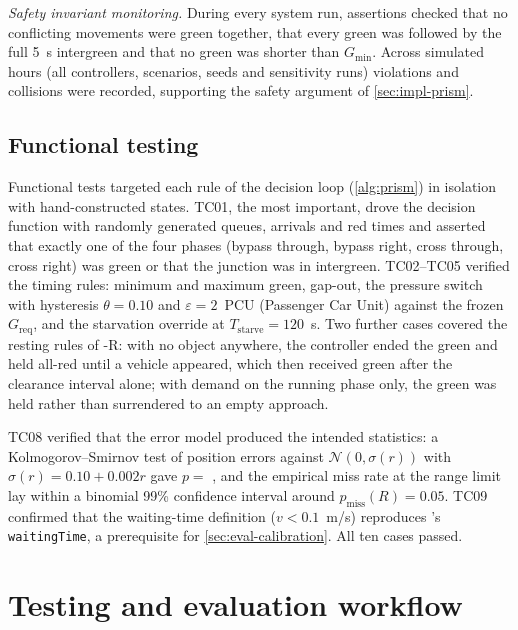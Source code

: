 \textit{Safety invariant monitoring.} During every system run, assertions checked that no conflicting movements were green together, that every green was followed by the full 5~s intergreen and that no green was shorter than $G_{\min}$. Across  simulated hours (all controllers, scenarios, seeds and sensitivity runs)  violations and  \sumo{} collisions were recorded, supporting the safety argument of \cref{sec:impl-prism}.

\subsection{Functional testing}\label{sec:eval-functional}

Functional tests targeted each rule of the decision loop (\cref{alg:prism}) in isolation with hand-constructed states. TC01, the most important, drove the decision function with randomly generated queues, arrivals and red times and asserted that exactly one of the four phases (bypass through, bypass right, cross through, cross right) was green or that the junction was in intergreen. TC02--TC05 verified the timing rules: minimum and maximum green, gap-out, the pressure switch with hysteresis $\theta = 0.10$ and $\varepsilon = 2$~PCU (Passenger Car Unit) against the frozen $G_{\text{req}}$, and the starvation override at $T_{\text{starve}} = 120$~s. Two further cases covered the resting rules of \prism{}-R: with no object anywhere, the controller ended the green and held all-red until a vehicle appeared, which then received green after the clearance interval alone; with demand on the running phase only, the green was held rather than surrendered to an empty approach.

TC08 verified that the \vls{} error model produced the intended statistics: a Kolmogorov--Smirnov test of position errors against $\mathcal{N}(0, \sigma(r))$ with $\sigma(r) = 0.10 + 0.002r$ gave $p =$ , and the empirical miss rate at the range limit lay within a binomial 99\% confidence interval around $p_{\text{miss}}(R) = 0.05$. TC09 confirmed that the \dtx{} waiting-time definition ($v < 0.1$~m/s) reproduces \sumo{}'s \texttt{waitingTime}, a prerequisite for \cref{sec:eval-calibration}. All ten cases passed.

\section{Testing and evaluation workflow}\label{sec:eval-workflow}


